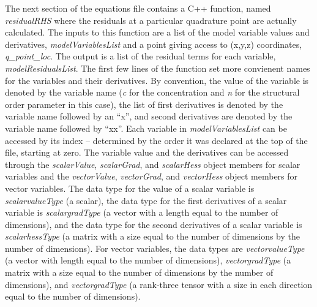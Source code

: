 \documentclass[10pt]{article} %
\begin{document}
The next section of the equations file contains a C++ function, named \emph{residualRHS} where the residuals at a particular quadrature point are actually calculated. The inputs to this function are a list of the model variable values and derivatives, \emph{modelVariablesList} and a point giving access to (x,y,z) coordinates, \emph{q\_point\_loc}. The output is a list of the residual terms for each variable, \emph{modelResidualsList}. The first few lines of the function set more convienent names for the variables and their derivatives. By convention, the value of the variable is denoted by the variable name (\emph{c} for the concentration and \emph{n} for the structural order parameter in this case), the list of first derivatives is denoted by the variable name followed by an ``x'', and second derivatives are denoted by the variable name followed by ``xx''. Each variable in \emph{modelVariablesList} can be accessed by its index -- determined by the order it was declared at the top of the file, starting at zero. The variable value and the derivatives can be accessed through the \emph{scalarValue},  \emph{scalarGrad}, and \emph{scalarHess} object members for scalar variables and the  \emph{vectorValue},  \emph{vectorGrad}, and \emph{vectorHess} object members for vector variables. The data type for the value of a scalar variable is \emph{scalarvalueType} (a scalar), the data type for the first derivatives of a scalar variable is \emph{scalargradType} (a vector with a length equal to the number of dimensions), and the data type for the second derivatives of a scalar variable is \emph{scalarhessType} (a matrix with a size equal to the number of dimensions by the number of dimensions). For vector variables, the data types are \emph{vectorvalueType} (a vector with length equal to the number of dimensions), \emph{vectorgradType} (a matrix with a size equal to the number of dimensions by the number of dimensions), and \emph{vectorgradType} (a rank-three tensor with a size in each direction equal to the number of dimensions).
\end{document}
